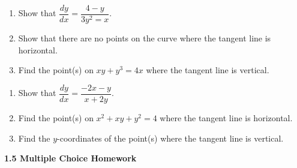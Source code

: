 \begin{enumerate}[label=\hspace{11pt}(\alph*), align=left, leftmargin=*, labelsep=0.25em]
    \item Show that $\dfrac{dy}{dx} = \dfrac{4 - y}{3y^2 = x}$.
    \item Show that there are no points on the curve where the tangent line is horizontal.
    \item Find the point(s) on $xy + y^3 = 4x$ where the tangent line is vertical.
\end{enumerate} \vspace{11pt}

\begin{enumerate}[label=\hspace{11pt}(\alph*), align=left, leftmargin=*, labelsep=0.25em]
    \item Show that $\dfrac{dy}{dx} = \dfrac{-2x - y}{x + 2y}$.
    \item Find the point(s) on $x^2 + xy + y^2 = 4$ where the tangent line is horizontal.
    \item Find the $y$-coordinates of the point(s) where the tangent line is vertical.
\end{enumerate} \vspace{11pt}

\textbf{\large{1.5 Multiple Choice Homework}} \par

